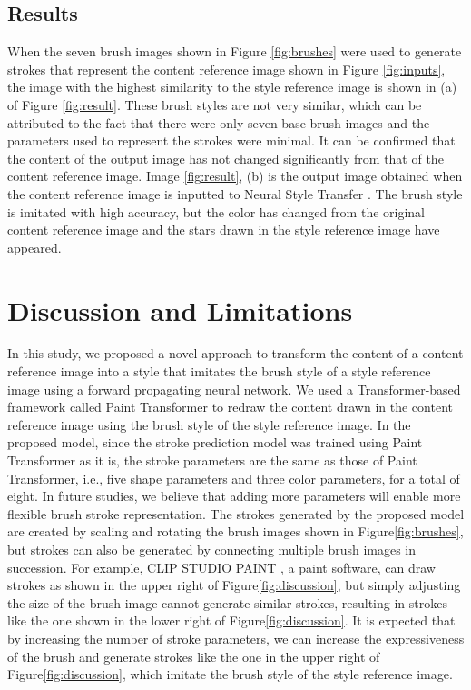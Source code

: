 \documentclass{mva_style}
\begin{document}
\subsection{Results}
When the seven brush images shown in Figure \ref{fig:brushes} were used to 
generate strokes that represent the content reference image shown in Figure 
\ref{fig:inputs}, the image with the highest similarity to the style reference 
image is shown in (a) of Figure \ref{fig:result}. 
These brush styles are not very similar, which can be attributed to the fact 
that there were only seven base brush images and the parameters used to represent 
the strokes were minimal. It can be confirmed that the content of the output 
image has not changed significantly from that of the content reference image.
Image \ref{fig:result}, (b) is the output image obtained when the content 
reference image is inputted to Neural Style Transfer \cite{ImageStyleTransfer}.
The brush style is imitated 
with high accuracy, but the color has changed from the original content 
reference image and the stars drawn in the style reference image have appeared.

\section{Discussion and Limitations}
In this study, we proposed a novel approach to transform the content of a 
content reference image into a style that imitates the brush style of a style 
reference image using a forward propagating neural network. 
We used a Transformer-based framework called Paint Transformer to redraw the 
content drawn in the content reference image using the brush style of the 
style reference image. In the proposed model, since the stroke 
prediction model was trained using Paint Transformer as it is, the stroke 
parameters are the same as those of Paint Transformer, i.e., five shape 
parameters and three color parameters, for a total of eight. In future studies, 
we believe that adding more parameters will enable more flexible brush stroke 
representation. The strokes generated by the proposed model are created by 
scaling and rotating the brush images shown in Figure\ref{fig:brushes}, but 
strokes can also be generated by connecting multiple brush images in 
succession. For example, CLIP STUDIO PAINT \cite{ClipStudio}, a paint software, 
can draw strokes as shown in the upper right of Figure\ref{fig:discussion}, but simply 
adjusting the size of the brush image cannot generate similar strokes, 
resulting in strokes like the one shown in the lower right of Figure\ref{fig:discussion}.
It is expected that by increasing the number of stroke parameters, we can 
increase the expressiveness of the brush and generate strokes like the one 
in the upper right of Figure\ref{fig:discussion}, which imitate the brush style of the 
style reference image. 
\end{document}
